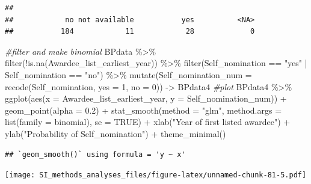 \documentclass[
]{article}
\newenvironment{Shaded}{\begin{snugshade}}{\end{snugshade}}
\newcommand{\AttributeTok}[1]{\textcolor[rgb]{0.77,0.63,0.00}{#1}}
\newcommand{\CommentTok}[1]{\textcolor[rgb]{0.56,0.35,0.01}{\textit{#1}}}
\newcommand{\ConstantTok}[1]{\textcolor[rgb]{0.00,0.00,0.00}{#1}}
\newcommand{\DecValTok}[1]{\textcolor[rgb]{0.00,0.00,0.81}{#1}}
\newcommand{\FloatTok}[1]{\textcolor[rgb]{0.00,0.00,0.81}{#1}}
\newcommand{\FunctionTok}[1]{\textcolor[rgb]{0.00,0.00,0.00}{#1}}
\newcommand{\NormalTok}[1]{#1}
\newcommand{\OtherTok}[1]{\textcolor[rgb]{0.56,0.35,0.01}{#1}}
\newcommand{\SpecialCharTok}[1]{\textcolor[rgb]{0.00,0.00,0.00}{#1}}
\newcommand{\StringTok}[1]{\textcolor[rgb]{0.31,0.60,0.02}{#1}}
\begin{document}
\begin{verbatim}
## 
##            no not available           yes          <NA> 
##           184            11            28             0
\end{verbatim}

\begin{Shaded}
\begin{Highlighting}[]
\CommentTok{\#filter and make binomial }
\NormalTok{BPdata }\SpecialCharTok{\%\textgreater{}\%} 
  \FunctionTok{filter}\NormalTok{(}\SpecialCharTok{!}\FunctionTok{is.na}\NormalTok{(Awardee\_list\_earliest\_year)) }\SpecialCharTok{\%\textgreater{}\%} 
  \FunctionTok{filter}\NormalTok{(Self\_nomination }\SpecialCharTok{==} \StringTok{"yes"} \SpecialCharTok{|}\NormalTok{ Self\_nomination }\SpecialCharTok{==} \StringTok{"no"}\NormalTok{) }\SpecialCharTok{\%\textgreater{}\%}  
  \FunctionTok{mutate}\NormalTok{(}\AttributeTok{Self\_nomination\_num =} \FunctionTok{recode}\NormalTok{(Self\_nomination, }\AttributeTok{yes =} \DecValTok{1}\NormalTok{, }\AttributeTok{no =} \DecValTok{0}\NormalTok{)) }\OtherTok{{-}\textgreater{}}\NormalTok{ BPdata4}
\CommentTok{\#plot}
\NormalTok{BPdata4  }\SpecialCharTok{\%\textgreater{}\%} 
  \FunctionTok{ggplot}\NormalTok{(}\FunctionTok{aes}\NormalTok{(}\AttributeTok{x =}\NormalTok{ Awardee\_list\_earliest\_year, }\AttributeTok{y =}\NormalTok{ Self\_nomination\_num)) }\SpecialCharTok{+} 
  \FunctionTok{geom\_point}\NormalTok{(}\AttributeTok{alpha =} \FloatTok{0.2}\NormalTok{) }\SpecialCharTok{+} 
  \FunctionTok{stat\_smooth}\NormalTok{(}\AttributeTok{method =} \StringTok{"glm"}\NormalTok{, }\AttributeTok{method.args =} \FunctionTok{list}\NormalTok{(}\AttributeTok{family =}\NormalTok{ binomial), }\AttributeTok{se =} \ConstantTok{TRUE}\NormalTok{) }\SpecialCharTok{+}
  \FunctionTok{xlab}\NormalTok{(}\StringTok{"Year of first listed awardee"}\NormalTok{) }\SpecialCharTok{+} 
  \FunctionTok{ylab}\NormalTok{(}\StringTok{"Probability of Self\_nomination"}\NormalTok{) }\SpecialCharTok{+}
  \FunctionTok{theme\_minimal}\NormalTok{()}
\end{Highlighting}
\end{Shaded}

\begin{verbatim}
## `geom_smooth()` using formula = 'y ~ x'
\end{verbatim}

\texttt{[image: SI\_methods\_analyses\_files/figure-latex/unnamed-chunk-81-5.pdf]}
\end{document}
